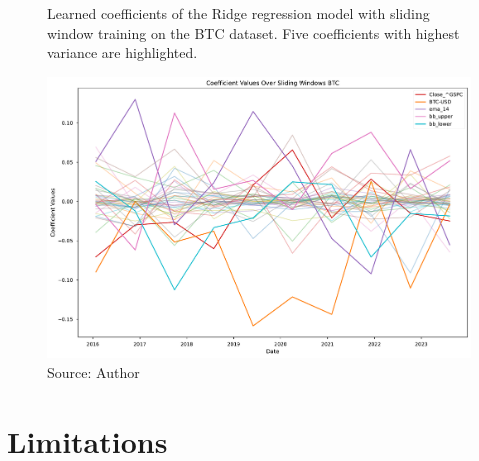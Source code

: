 \begin{figure}[!h]
    \centering
    \caption{Learned coefficients of the Ridge regression model
    with sliding window training on the BTC dataset. Five 
    coefficients with highest variance are highlighted.}
    \includegraphics[width=1\textwidth]{Figures/coefficient_values_sliding_btc.pdf}
    \caption*{Source: Author}
    \label{fig:coefs_sliding_btc}
\end{figure}

\section{Limitations}
\label{sec:limitations}
